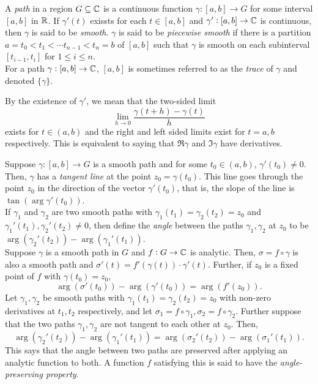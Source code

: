 	\begin{fdef}
		A \emph{path} in a region $G \subseteq \mathbb{C}$ is a continuous function $\gamma:[a,b]\to G$ for some interval $[a,b]$ in $\mathbb{R}$. If $\gamma'(t)$ exissts for each $t \in [a,b]$ and $\gamma':[a,b]\to\mathbb{C}$ is continuous, then $\gamma$ is said to be \emph{smooth}. $\gamma$ is said to be \emph{piecewise smooth} if there is a partition $a=t_0 < t_1 < \cdots t_{n-1} < t_n = b$ of $[a,b]$ such that $\gamma$ is smooth on each subinterval $[t_{i-1},t_i]$ for $1\le i\le n$.\\
		For a path $\gamma : [a,b] \to \mathbb{C}$, $[a,b]$ is sometimes referred to as the \emph{trace} of $\gamma$ and denoted $\{\gamma\}$.
	\end{fdef}

	By the existence of $\gamma'$, we mean that the two-sided limit
	\[ \lim_{h\to 0} \frac{\gamma(t+h)-\gamma(t)}{h} \]
	exists for $t \in (a,b)$ and the right and left sided limits exist for $t = a,b$ respectively. This is equivalent to saying that $\Re \gamma$ and $\Im \gamma$ have derivatives.

	Suppose $\gamma : [a,b] \to G$ is a smooth path and for some $t_0 \in (a,b)$, $\gamma'(t_0) \ne 0$. Then, $\gamma$ has a \emph{tangent line} at the point $z_0 = \gamma(t_0)$. This line goes through the point $z_0$ in the direction of the vector $\gamma'(t_0)$, that is, the slope of the line is $\tan(\arg \gamma'(t_0))$.\\

	If $\gamma_1$ and $\gamma_2$ are two smooth paths with $\gamma_1(t_1) = \gamma_2(t_2) = z_0$ and $\gamma_1'(t_1),\gamma_2'(t_2) \ne 0$, then define the \emph{angle} between the paths $\gamma_1,\gamma_2$ at $z_0$ to be $\arg(\gamma_2'(t_2)) - \arg(\gamma_1'(t_1))$.\\

	Suppose $\gamma$ is a smooth path in $G$ and $f:G\to\mathbb{C}$ is analytic. Then, $\sigma = f \circ \gamma$ is also a smooth path and $\sigma'(t) = f'(\gamma(t)) \cdot \gamma'(t)$. Further, if $z_0$ is a fixed point of $f$ with $\gamma(t_0) = z_0$,
	\[ \arg(\sigma'(t_0)) - \arg(\gamma'(t_0)) = \arg(f'(z_0)). \]
	Let $\gamma_1,\gamma_2$ be smooth paths with $\gamma_1(t_1) = \gamma_2(t_2) = z_0$ with non-zero derivatives at $t_1,t_2$ respectively, and let $\sigma_1 = f \circ \gamma_1, \sigma_2 = f \circ \gamma_2$. Further suppose that the two paths $\gamma_1,\gamma_2$ are not tangent to each other at $z_0$. Then,
	\[ \arg(\gamma_2'(t_2)) - \arg(\gamma_1'(t_1)) = \arg(\sigma_2'(t_2)) - \arg(\sigma_1'(t_1)). \]
	This says that the angle between two paths are preserved after applying an analytic function to both. A function $f$ satisfying this is said to have the \emph{angle-preserving property}.

